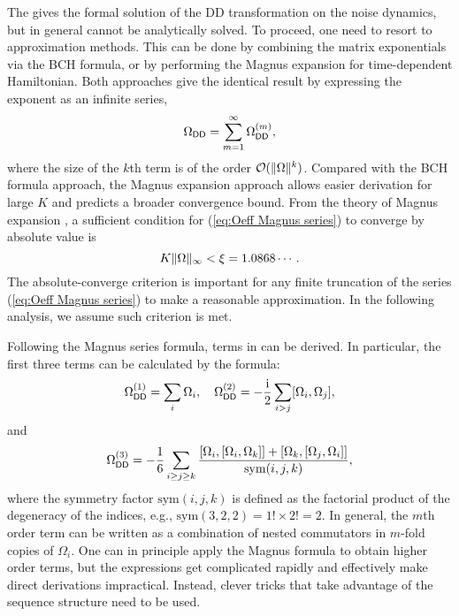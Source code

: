 \documentclass[aps,pra,reprint,superscriptaddress]{revtex4-2}
\newcommand{\Odd}{\Omega_{\mathsf{DD}}}
\begin{document}
The  gives the formal solution of the DD transformation on the noise dynamics, but in general cannot be analytically solved.
To proceed, one need to resort to 
approximation methods. This can be done by combining the matrix exponentials via the BCH formula, or by performing the Magnus expansion for time-dependent Hamiltonian.
Both approaches give the identical result by expressing the exponent as an infinite series,
\begin{equation}\label{eq:Oeff Magnus series}
   \Odd  = \sum_{m=1}^\infty \Odd\up{m},
\end{equation}
where the size of the $k$th term is of the order $\mathcal{O}(\Vert {\Omega} \Vert^k)$. Compared with the BCH formula approach, the Magnus expansion approach allows easier derivation for large $K$ and predicts a broader convergence bound.
From the theory of Magnus expansion \cite{blanes2009magnus}, a sufficient condition for  (\ref{eq:Oeff Magnus series}) to converge by absolute value is
\begin{equation}\label{dd:Magnus-abs-converge}
K\Vert {\Omega } \Vert_\infty  < \xi=1.0868\cdots.
\end{equation}
The absolute-converge criterion is important for any finite truncation of the series (\ref{eq:Oeff Magnus series}) to make a reasonable approximation. 
In the following analysis, we assume such criterion is met.

Following the Magnus series formula, terms in  can be derived. In particular,  the first three terms can be calculated by the formula:
\begin{align}\label{eq:Magnus-12}
\Odd\up{1} = \sum_{i} \Omega_i,\quad
\Odd\up{2} =-\frac{\upi}{2} \sum_{i>j} [\Omega_i,\Omega_j], 
\end{align}
and 
\begin{align}\label{eq:Magnus-3rd}
\Odd\up{3} = -\frac{1}{6} \sum_{i\ge j\ge k}
\frac{ [\Omega_i,[\Omega_i,\Omega_k]]+[\Omega_k,[\Omega_j,\Omega_i]] }
{\mathrm{sym}({i,j,k})},
\end{align}
where the symmetry factor $\mathrm{sym}(i,j,k)$ is defined as the factorial product of the degeneracy of the indices, e.g., $\mathrm{sym}(3,2,2) =1!\times 2!=2$. In general, the $m$th order term can be written as a combination of nested commutators in $m$-fold copies of $\Omega_i$.
One can in principle apply the Magnus formula to obtain higher order terms,  but the expressions get complicated rapidly and effectively make direct derivations impractical. Instead, clever tricks that take advantage of the sequence structure need to be used.
\end{document}
